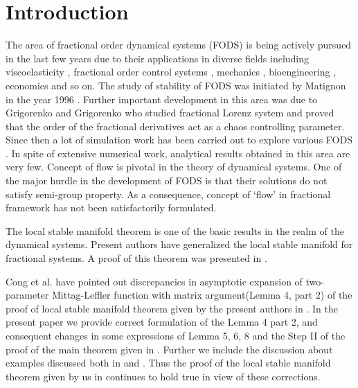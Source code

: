 	\section{Introduction}
	The area of fractional order dynamical systems (FODS) is being actively pursued in the last few years due to their applications in diverse fields including viscoelasticity \cite{mainardi2010fractional}, fractional order control systems \cite{podlubny1999fractional}, mechanics \cite{riewe1996nonconservative, riewe1997mechanics}, bioengineering \cite{magin2004fractional}, economics \cite{jun2001study} and so on. The study of stability of FODS was initiated by Matignon in the year 1996 \cite{matignon1996stability}. Further important development in this area was due to Grigorenko and Grigorenko \cite{grigorenko2003chaotic} who studied fractional Lorenz system and proved that the order of the fractional derivatives act as a chaos controlling parameter. Since then a lot of simulation work has been carried out to explore various FODS \cite{tavazoei2008chaotic, daftardar2010chaos, bhalekar2010fractional, li2006chaos, yu2008synchronization}. In spite of  extensive numerical work, analytical results obtained in this area are very few. Concept of flow is pivotal in the theory of dynamical systems. One of the major hurdle in the development of FODS is that their solutions do not satisfy semi-group property. As a consequence, concept of `flow' in fractional framework has not been satisfactorily formulated. 
	
	The local stable manifold theorem is one of the basic results in the realm of the dynamical systems. Present authors have generalized the local stable manifold for fractional systems. A proof of this theorem was presented in \cite{deshpande2016local}.
	
	
	
	Cong et al. \cite{cong2016stable} have pointed out discrepancies in asymptotic expansion of two-parameter Mittag-Leffler function with matrix argument(Lemma 4, part 2) of the proof of local stable manifold theorem given by the present authors in \cite{deshpande2016local}. In the present paper we provide correct formulation of the Lemma 4 part 2, and consequent changes in some expressions of Lemma 5, 6, 8 and the Step II of the proof of the main theorem given in \cite{deshpande2016local}. Further we include the discussion about examples discussed both in \cite{deshpande2016local} and \cite{cong2016stable}. Thus the proof of the local stable manifold theorem given by us in \cite{deshpande2016local} continues to hold true in view of these corrections.
